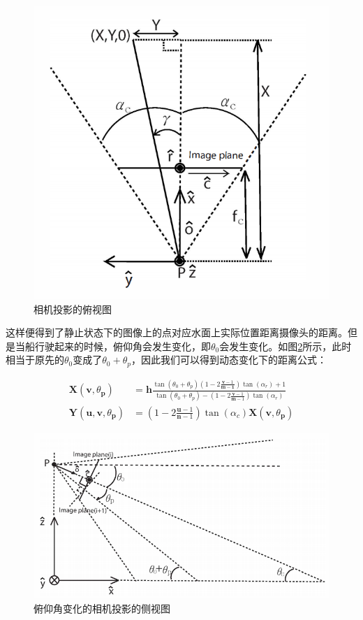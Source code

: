 \documentclass[cn,12pt,color=mine,scheme=chinese,bibstyle=gb7714-2015]{elegantbook}
\begin{document}
\begin{figure}[h]
	\centering
	\includegraphics[width=.65\linewidth]{images/fushi}
	\caption{相机投影的俯视图}
	\label{fushi}
\end{figure}

这样便得到了静止状态下的图像上的点对应水面上实际位置距离摄像头的距离。但是当船行驶起来的时候，俯仰角会发生变化，即$\theta_{0}$会发生变化。如图\ref{ceshi2}所示，此时相当于原先的$\theta_{0}$变成了$\theta_{0}+\theta_p$，因此我们可以得到动态变化下的距离公式：

\begin{equation}
	\begin{aligned}
		\mathbf{X}\left(\mathbf{v}, \theta_{\mathbf{p}}\right) &=\mathbf{h} \frac{\tan \left(\theta_{0}+\theta_{p}\right)\left(1-2 \frac{\mathbf{v}-1}{\mathbf{m}-\mathbf{1}}\right) \tan \left(\alpha_{r}\right)+1}{\tan \left(\theta_{0}+\theta_{p}\right)-\left(1-2 \frac{\mathbf{v}-1}{\mathbf{m}-1}\right) \tan \left(\alpha_{r}\right)} \\
		\mathbf{Y}\left(\mathbf{u}, \mathbf{v}, \theta_{\mathbf{p}}\right) &=\left(1-2 \frac{\mathbf{u}-1}{\mathbf{n}-1}\right) \tan \left(\alpha_{c}\right) \mathbf{X}\left(\mathbf{v}, \theta_{\mathbf{p}}\right)
	\end{aligned}
\end{equation}

\begin{figure}[h]
	\centering
	\includegraphics[width=.75\linewidth]{images/ceshi2}
	\caption{俯仰角变化的相机投影的侧视图}
	\label{ceshi2}
\end{figure}
\end{document}
